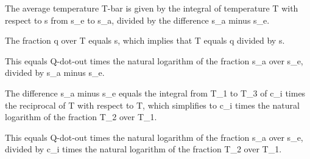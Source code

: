 The average temperature T-bar is given by the integral of temperature T with respect to s from s_e to s_a, divided by the difference s_a minus s_e.

The fraction q over T equals s, which implies that T equals q divided by s.

This equals Q-dot-out times the natural logarithm of the fraction s_a over s_e, divided by s_a minus s_e.

The difference s_a minus s_e equals the integral from T_1 to T_3 of c_i times the reciprocal of T with respect to T, which simplifies to c_i times the natural logarithm of the fraction T_2 over T_1.

This equals Q-dot-out times the natural logarithm of the fraction s_a over s_e, divided by c_i times the natural logarithm of the fraction T_2 over T_1.